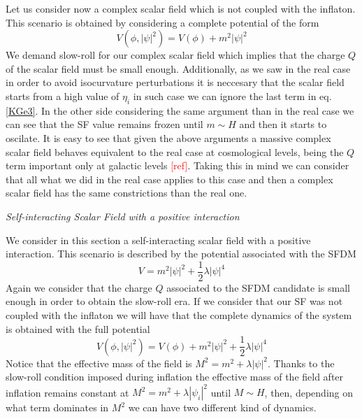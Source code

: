 \documentclass[amssymb,twocolumn,prd,nofootinbib,showpacs]{revtex4-1}
\begin{document}
Let us consider now a complex scalar field which is not coupled with the inflaton. This scenario is obtained by considering a complete potential of the form
\begin{equation}
V(\phi,|\psi|^2)=V(\phi)+m^2|\psi|^2
\end{equation}
We demand slow-roll for our complex scalar field which implies that the charge $Q$ of the scalar field must be small enough. Additionally, as we saw in the real case in order to avoid isocurvature perturbations it is neccesary that the scalar field starts from a high value of $\eta_i$ in such case we can ignore the last term in eq. \eqref{KGe3}. In the other side considering the same argument than in the real case we can see that the SF value remains frozen until $m\sim H$ and then it starts to oscilate. It is easy to see that given the above arguments a massive complex scalar field behaves equivalent to the real case at cosmological levels, being the $Q $ term important only at galactic levels \textcolor{red}{[ref]}. Taking this in mind we can consider that all what we did in the real case applies to this case and then a complex scalar field has the same constrictions than the real one. 
\begin{center}
\textit{Self-interacting Scalar Field with a positive interaction}
\end{center}

We consider in this section a self-interacting scalar field with a positive interaction. This scenario is described by the potential associated with the SFDM
\begin{equation}
V = m^2|\psi|^2+\frac{1}{2}\lambda |\psi|^4
\end{equation}
Again we consider that the charge $Q$ associated to the SFDM candidate is small enough in order to obtain the slow-roll era. If we consider that our SF was not coupled with the inflaton we will have that the complete dynamics of the system is obtained with the full potential 
\begin{equation}
V(\phi,|\psi|^2)=V(\phi)+m^2|\psi|^2+\frac{1}{2}\lambda|\psi|^4
\end{equation}
Notice that the effective mass of the field is $M^2=m^2+\lambda|\psi|^2$. Thanks to the slow-roll condition imposed during inflation the effective mass of the field after inflation remains constant at $M^2=m^2+\lambda|\psi_i|^2$ until $M\sim H$, then, depending on what term dominates in $M^2$ we can have two different kind of dynamics. 
\\
\end{document}
